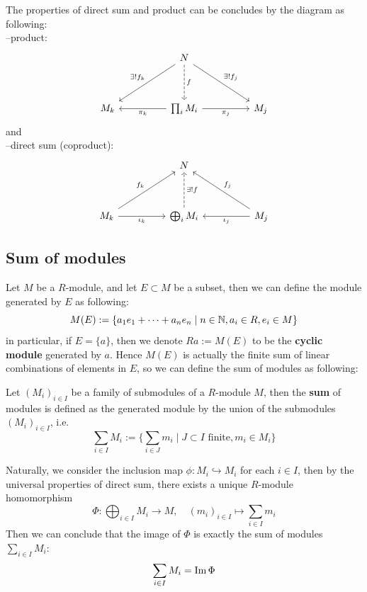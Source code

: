     The properties of direct sum and product can be concludes by the diagram as following:\\
    --product:
\[\begin{tikzcd}
	&& N \\
	\\
	{M_k} && {\prod_iM_i} && {M_j}
	\arrow["{\exists! f_k}"', from=1-3, to=3-1]
	\arrow["f", dashed, from=1-3, to=3-3]
	\arrow["{\exists! f_j}", from=1-3, to=3-5]
	\arrow["{\pi_k}", from=3-3, to=3-1]
	\arrow["{\pi_j}"', from=3-3, to=3-5]
\end{tikzcd}\]
 and\\
--direct sum (coproduct):
\[\begin{tikzcd}
	&& N \\
	\\
	{M_k} && {\bigoplus_iM_i} && {M_j}
	\arrow["{f_k}", from=3-1, to=1-3]
	\arrow["{\iota_k}"', from=3-1, to=3-3]
	\arrow["{\exists! f}"', dashed, from=3-3, to=1-3]
	\arrow["{f_j}"', from=3-5, to=1-3]
	\arrow["{\iota_j}", from=3-5, to=3-3]
\end{tikzcd}\]

\subsection*{Sum of modules}
Let \(M\) be a \(R\)-module, and let \(E \subset M\) be a subset, then we can define the module generated by \(E\) as following:
\[M(E) := \{a_1e_1+\dots+a_ne_n \mid n\in \mathbb{N}, a_i\in R, e_i \in M\}\]
in particular, if \(E= \{a\}\), then we denote \(Ra := M(E)\) to be the \textbf{cyclic module }generated by \(a\). Hence \(M(E)\) is actually the finite sum of linear combinations of elements in \(E\), so we can define the sum of modules as following:
\begin{definition}
    Let \((M_i)_{i \in I}\) be a family of submodules of a \(R\)-module \(M\), then the \textbf{sum} of modules is defined as the generated module by the union of the submodules \((M_i)_{i \in I}\), i.e.
    \[\sum_{i \in I} M_i := \{\sum_{i \in J} m_{i} \mid J \subset I \text{ finite}, m_{i} \in M_i\}\]
\end{definition}
Naturally, we consider the inclusion map \(\phi: M_i \hookrightarrow M_i\) for each \(i \in I\), then by the universal properties of direct sum, there exists a unique \(R\)-module homomorphism
\[\Phi: \bigoplus_{i \in I}M_i \to M, \quad (m_i)_{i \in I} \mapsto \sum_{i \in I}m_i\]
Then we can conclude that the image of \(\Phi\) is exactly the sum of modules \(\sum_{i \in I} M_i\):
\[\sum_{i \in I}M_i = \operatorname{Im} \Phi\]

